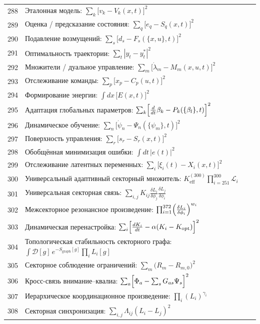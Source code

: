 \documentclass[12pt,a4paper]{article}
\begin{document}
\begin{longtable}{r l}
		288 & Эталонная модель: $\sum_k\bigl[v_k - V_k(x,t)\bigr]^2$ \\
		289 & Оценка / предсказание состояния: $\sum_q\bigl[e_q - S_q(x,t)\bigr]^2$ \\
		290 & Подавление возмущений: $\sum_s\bigl[d_s - F_s(\{x,u\},t)\bigr]^2$ \\
		291 & Оптимальность траектории: $\sum_t|y_t - y_t^*|^2$ \\
		292 & Множители / дуальное управление: $\sum_m\bigl[\dot\lambda_m - M_m(x,u,t)\bigr]^2$ \\
		293 & Отслеживание команды: $\sum_p\bigl[x_p - C_p(u,t)\bigr]^2$ \\
		294 & Формирование энергии: $\int dx\,\bigl[E(x,t)\bigr]^2$ \\
		295 & Адаптация глобальных параметров: $\sum_k\Bigl[\frac{d}{dt}\beta_k - P_k(\{\beta_l\},t)\Bigr]^2$ \\
		296 & Динамическое обучение: $\sum_n\bigl[\dot\psi_n - \Psi_n(\{\psi_m\},t)\bigr]^2$ \\
		297 & Поверхность управления: $\sum_r\bigl[s_r - S_r(x,t)\bigr]^2$ \\
		298 & Обобщённая минимизация ошибки: $\int dt\,|e(t)|^2$ \\
		299 & Отслеживание латентных переменных: $\sum_i\bigl[\xi_i(t) - X_i(x,t)\bigr]^2$ \\
		300 & Универсальный адаптивный секторный множитель: $K^{(300)}_{\mathrm{eff}}\prod_{i=251}^{300}\mathcal{L}_i$ \\
		301 & Универсальная секторная связь: $\sum_{i,j}K_{ij}\frac{\delta L_i}{\delta\phi_j}\frac{\delta L_j}{\delta\phi_i}$ \\
		302 & Межсекторное резонансное произведение: $\prod_{i=1}^{372}\Bigl(\frac{\delta L_i}{\delta\phi_i}\Bigr)^{w_i}$ \\
		303 & Динамическая перенастройка: $\sum_i\Bigl[\frac{dK_i}{dt} - \alpha(K_i - K_{\text{opt}})\Bigr]^2$ \\
		304 & Топологическая стабильность секторного графа: $\int\mathcal{D}[g]\,e^{-S_{\text{graph}}[g]}\prod_i L_i[g]$ \\
		305 & Секторное соблюдение ограничений: $\sum_m\bigl(R_m - R_{m,0}\bigr)^2$ \\
		306 & Кросс-связь внимание–квалиа: $\sum_a\Bigl[\Phi_a - \sum_s G_{as}\Psi_s\Bigr]^2$ \\
		307 & Иерархическое координационное произведение: $\prod_i(L_i)^{\gamma_i}$ \\
		308 & Секторная синхронизация: $\sum_{i,j}\Lambda_{ij}(L_i - L_j)^2$ \\

\end{longtable}
\end{document}
